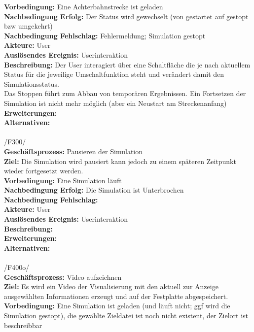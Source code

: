 \textbf{Vorbedingung:} Eine Achterbahnstrecke ist geladen\\
\textbf{Nachbedingung Erfolg:} Der Status wird gewechselt (von gestartet auf gestopt bzw umgekehrt)\\
\textbf{Nachbedingung Fehlschlag:} Fehlermeldung; Simulation gestopt\\
\textbf{Akteure:} User\\
\textbf{Auslösendes Ereignis:} Userinteraktion\\
\textbf{Beschreibung:} Der User interagiert über eine Schaltfläche die je nach aktuellem Status für die jeweilige Umschaltfunktion steht und verändert damit den Simulationsstatus.\\
Das Stoppen führt zum Abbau von temporären Ergebnissen. Ein Fortsetzen der Simulation ist nicht mehr möglich (aber ein Neustart am Streckenanfang)\\
\textbf{Erweiterungen:}\\
\textbf{Alternativen:}\\
\\
/F300/\\
\textbf{Geschäftsprozess:} Pausieren der Simulation\\
\textbf{Ziel:} Die Simulation wird pausiert kann jedoch zu einem späteren Zeitpunkt wieder fortgesetzt werden.\\
\textbf{Vorbedingung:} Eine Simulation läuft\\
\textbf{Nachbedingung Erfolg:} Die Simulation ist Unterbrochen\\
\textbf{Nachbedingung Fehlschlag:} \\
\textbf{Akteure:} User\\
\textbf{Auslösendes Ereignis:} Userinteraktion\\
\textbf{Beschreibung:} \\
\textbf{Erweiterungen:}\\
\textbf{Alternativen:}\\
\\
/F400o/ \\
\textbf{Geschäftsprozess:} Video aufzeichnen\\
\textbf{Ziel:} Es wird ein Video der Visualisierung mit den aktuell zur Anzeige ausgewählten Informationen erzeugt und auf der Festplatte abgespeichert.\\
\textbf{Vorbedingung:} Eine Simulation ist geladen (und läuft nicht; ggf wird die Simulation gestopt), die gewählte Zieldatei ist noch nicht existent, der Zielort ist beschreibbar\\
